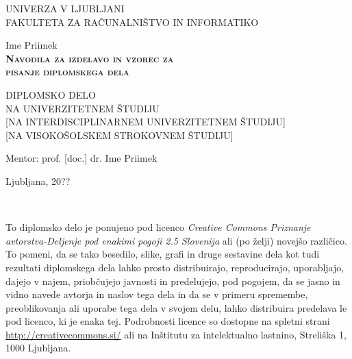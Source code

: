 \documentclass[12pt,a4paper,openany]{book}
\begin{document}
\thispagestyle{empty} 

\begin{center}
{\large 
UNIVERZA V LJUBLJANI\\
FAKULTETA ZA RAČUNALNIŠTVO IN INFORMATIKO\\
}

\vspace{3cm}
{\LARGE Ime Priimek}\\

\vspace{2cm}
\textsc{\textbf{\LARGE 
Navodila za izdelavo in vzorec za\\ 
pisanje diplomskega dela\\ 
}}

\vspace{2cm}
{ DIPLOMSKO DELO}\\
{ NA UNIVERZITETNEM ŠTUDIJU\\
}
{ [NA INTERDISCIPLINARNEM UNIVERZITETNEM ŠTUDIJU]\\
}
{ [NA VISOKOŠOLSKEM STROKOVNEM ŠTUDIJU]\\
}

\vspace{2cm} 
{\Large Mentor: prof. [doc.] dr. Ime Priimek}

\vfill
{\Large Ljubljana, 20??}
\end{center}

\newpage

\ \thispagestyle{empty}

\newpage


\thispagestyle{empty}

\vspace*{5cm}
{\small \noindent
To diplomsko delo je ponujeno pod licenco \textit{Creative Commons Priznanje avtorstva-Deljenje pod enakimi pogoji 2.5 Slovenija}
ali (po želji) novejšo različico.
To pomeni, da se tako besedilo, slike, grafi in druge sestavine dela kot tudi rezultati diplomskega dela lahko prosto distribuirajo,
reproducirajo, uporabljajo, dajejo v najem, priobčujejo javnosti in predelujejo, pod pogojem, da se jasno in vidno navede avtorja in naslov tega
dela in da se v primeru spremembe, preoblikovanja ali uporabe tega dela v svojem delu, lahko distribuira predelava le pod
licenco, ki je enaka tej.
Podrobnosti licence so dostopne na spletni strani \url{http://creativecommons.si/} ali na Inštitutu za
intelektualno lastnino, Streliška 1, 1000 Ljubljana.

\begin{center}%
  \hspace*{1ex}
\end{center}
}
\end{document}
